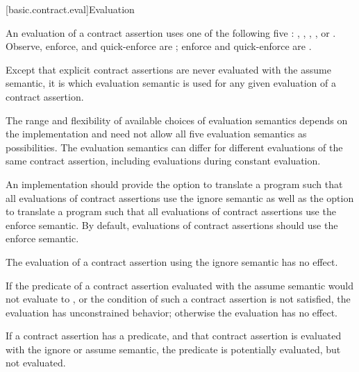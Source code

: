 [basic.contract.eval]{Evaluation}

\pnum
{}%
%
%
An evaluation of a contract assertion
uses one of the following five :
,
,
,
, or
.
Observe, enforce, and quick-enforce are ;
enforce and quick-enforce are .

\pnum
Except that
explicit contract assertions
are never evaluated
with the assume semantic,
it is
which evaluation semantic is used
for any given evaluation of a contract assertion.
\begin{note}
The range and flexibility of available choices of
evaluation semantics depends on the implementation
and need not allow all five evaluation semantics as possibilities.
The evaluation semantics can differ
for different evaluations of the same contract assertion,
including evaluations during constant evaluation.
\end{note}

\pnum
\recommended
An implementation should provide
the option to translate a program
such that all evaluations of contract assertions use the ignore semantic
as well as
the option to translate a program
such that all evaluations of contract assertions use the enforce semantic.
By default,
evaluations of contract assertions should use the enforce semantic.

\pnum
The evaluation of a contract assertion using the ignore semantic has no effect.

\pnum
If the predicate of
a contract assertion evaluated with the assume semantic
would not evaluate to ,
or the condition of such a contract assertion
is not satisfied,
the evaluation has unconstrained behavior;
otherwise the evaluation has no effect.

\pnum
\begin{note}
If a contract assertion has a predicate,
and that contract assertion is
evaluated with the ignore or assume semantic,
the predicate
is potentially evaluated,
but not evaluated.
\end{note}

